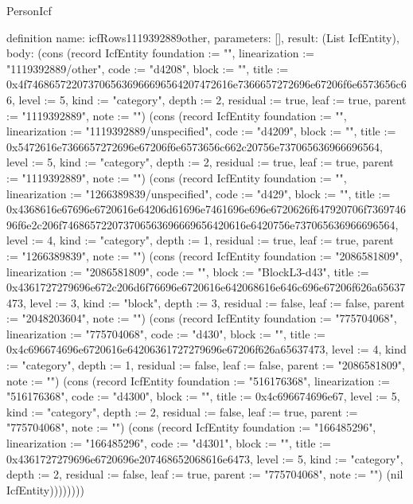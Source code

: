 \begin{lexlean}{PersonIcf}
\begin{semanticmodule}
definition{
  name: icfRows1119392889other,
  parameters: [],
  result: (List IcfEntity),
  body: (cons (record IcfEntity {foundation := "", linearization := "1119392889/other", code := "d4208", block := "", title := 0x4f7468657220737065636966696564207472616e7366657272696e67206f6e6573656c66, level := 5, kind := "category", depth := 2, residual := true, leaf := true, parent := "1119392889", note := ""}) (cons (record IcfEntity {foundation := "", linearization := "1119392889/unspecified", code := "d4209", block := "", title := 0x5472616e7366657272696e67206f6e6573656c662c20756e737065636966696564, level := 5, kind := "category", depth := 2, residual := true, leaf := true, parent := "1119392889", note := ""}) (cons (record IcfEntity {foundation := "", linearization := "1266389839/unspecified", code := "d429", block := "", title := 0x4368616e67696e6720616e64206d61696e7461696e696e6720626f647920706f736974696f6e2c206f746865722073706563696669656420616e6420756e737065636966696564, level := 4, kind := "category", depth := 1, residual := true, leaf := true, parent := "1266389839", note := ""}) (cons (record IcfEntity {foundation := "2086581809", linearization := "2086581809", code := "", block := "BlockL3-d43", title := 0x4361727279696e672c206d6f76696e6720616e642068616e646c696e67206f626a65637473, level := 3, kind := "block", depth := 3, residual := false, leaf := false, parent := "2048203604", note := ""}) (cons (record IcfEntity {foundation := "775704068", linearization := "775704068", code := "d430", block := "", title := 0x4c696674696e6720616e64206361727279696e67206f626a65637473, level := 4, kind := "category", depth := 1, residual := false, leaf := false, parent := "2086581809", note := ""}) (cons (record IcfEntity {foundation := "516176368", linearization := "516176368", code := "d4300", block := "", title := 0x4c696674696e67, level := 5, kind := "category", depth := 2, residual := false, leaf := true, parent := "775704068", note := ""}) (cons (record IcfEntity {foundation := "166485296", linearization := "166485296", code := "d4301", block := "", title := 0x4361727279696e6720696e207468652068616e6473, level := 5, kind := "category", depth := 2, residual := false, leaf := true, parent := "775704068", note := ""}) (nil IcfEntity))))))))
}


\end{semanticmodule}
\end{lexlean}
